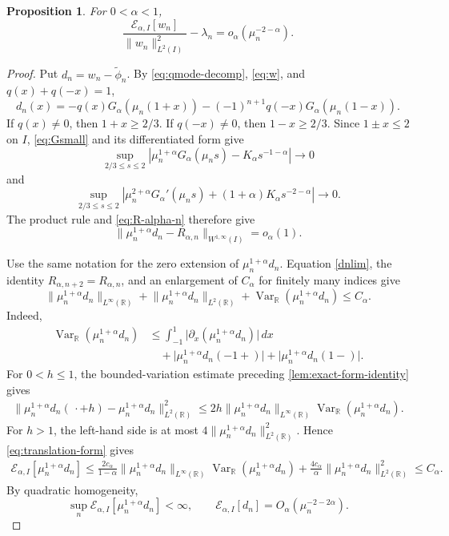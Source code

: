 \documentclass[11pt]{amsart}
\numberwithin{equation}{section}
\newtheorem{proposition}[proposition]{Proposition}
\theoremstyle{remark}
\newcommand{\R}{\mathbb R}
\newcommand{\wt}{\widetilde}
\newcommand{\norm}[2][]{\lVert #2\rVert_{#1}}
\newcommand{\abs}[1]{\lvert #1\rvert}
\newcommand{\Var}{\operatorname{Var}}
\newcommand{\calE}{\mathcal E}
\begin{document}
\begin{proposition}\label{prop:filtered}
For $0<\alpha<1$,
\begin{equation}\label{eq:filtered}
 \frac{\calE_{\alpha,I}[w_n]}{\norm[L^2(I)]{w_n}^2}
 -\lambda_n=o_\alpha(\mu_n^{-2-\alpha}).
\end{equation}
\end{proposition}

\begin{proof}
Put $d_n=w_n-\wt\phi_n$.  By \eqref{eq:qmode-decomp}, \eqref{eq:w}, and
$q(x)+q(-x)=1$,
\[
 d_n(x)=-q(x)G_\alpha(\mu_n(1+x))
 -(-1)^{n+1}q(-x)G_\alpha(\mu_n(1-x)).
\]
If $q(x)\ne0$, then $1+x\ge2/3$.  If $q(-x)\ne0$, then
$1-x\ge2/3$.  Since $1\pm x\le2$ on $I$, \eqref{eq:Gsmall} and its
differentiated form give
\[
 \sup_{2/3\le s\le2}
 \left|\mu_n^{1+\alpha}G_\alpha(\mu_ns)
 -K_\alpha s^{-1-\alpha}\right|\longrightarrow0
\]
and
\[
 \sup_{2/3\le s\le2}
 \left|\mu_n^{2+\alpha}G_\alpha'(\mu_ns)
 +(1+\alpha)K_\alpha s^{-2-\alpha}\right|\longrightarrow0.
\]
The product rule and \eqref{eq:R-alpha-n} therefore give
\begin{equation}\label{dnlim}
 \norm[W^{1,\infty}(I)]{\mu_n^{1+\alpha}d_n-R_{\alpha,n}}
 =o_\alpha(1).
\end{equation}

Use the same notation for the zero extension of $\mu_n^{1+\alpha}d_n$.
Equation \eqref{dnlim}, the identity $R_{\alpha,n+2}=R_{\alpha,n}$, and an
enlargement of $C_\alpha$ for finitely many indices give
\[
 \norm[L^\infty(\R)]{\mu_n^{1+\alpha}d_n}
 +\norm[L^2(\R)]{\mu_n^{1+\alpha}d_n}
 +\Var_\R(\mu_n^{1+\alpha}d_n)\le C_\alpha.
\]
Indeed,
\[
 \begin{aligned}
 \Var_\R(\mu_n^{1+\alpha}d_n)
 &\le\int_{-1}^1
 \abs{\partial_x(\mu_n^{1+\alpha}d_n)}\,dx\\
 &\quad+\abs{\mu_n^{1+\alpha}d_n(-1+)}
 +\abs{\mu_n^{1+\alpha}d_n(1-)}.
 \end{aligned}
\]
For $0<h\le1$, the bounded-variation estimate preceding
\cref{lem:exact-form-identity} gives
\[
 \begin{aligned}
 \norm[L^2(\R)]{
 \mu_n^{1+\alpha}d_n(\,\cdot+h)-\mu_n^{1+\alpha}d_n}^2\le2h\norm[L^\infty(\R)]{\mu_n^{1+\alpha}d_n}
 \Var_\R(\mu_n^{1+\alpha}d_n).
 \end{aligned}
\]
For $h>1$, the left-hand side is at most
$4\norm[L^2(\R)]{\mu_n^{1+\alpha}d_n}^2$.  Hence
\eqref{eq:translation-form} gives
\[
 \begin{aligned}
 \calE_{\alpha,I}[\mu_n^{1+\alpha}d_n]
 \le \frac{2c_\alpha}{1-\alpha}
 \norm[L^\infty(\R)]{\mu_n^{1+\alpha}d_n}
 \Var_\R(\mu_n^{1+\alpha}d_n)+\frac{4c_\alpha}{\alpha}
 \norm[L^2(\R)]{\mu_n^{1+\alpha}d_n}^2
 \le C_\alpha.
 \end{aligned}
\]
By quadratic homogeneity,
\[
 \sup_n\calE_{\alpha,I}[\mu_n^{1+\alpha}d_n]<\infty,
 \qquad
 \calE_{\alpha,I}[d_n]=O_\alpha(\mu_n^{-2-2\alpha}).
\]


\end{proof}
\end{document}
